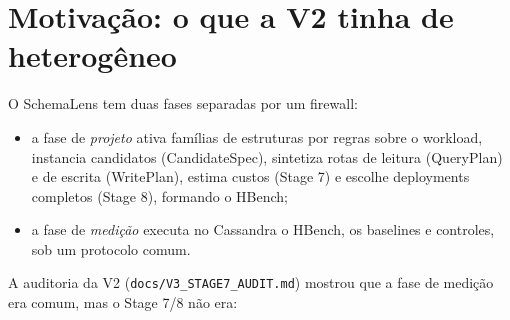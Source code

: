 \documentclass[10pt,a4paper,twoside]{article}
\theoremstyle{definition}\newtheorem{definicao}{Definição}
\begin{document}
\begin{abstract}
\noindent Resultados:
\begin{itemize}
\item O espaço foi reduzido em 67\% a 98\%.
\item Em todos os benchmarks o HBench V3 contém o melhor deployment medido ou um empatado com ele pelo piso de ruído A/A, com regret de 0 a 1,7\%.
\item O rank~1 do TSBS gasta \tsbsRankOneNat$\times$ o tempo do esquema original do TSBS (\tsbsRankOneAli$\times$ na coorte alinhada).
\item No RUBiS 4.1.12, o melhor membro do HBench é 23\% a 29\% mais rápido que NoSE e QPG nas cargas de leitura e mistas, com os mesmos vereditos em 3.11.11 e 100\% de concordância com o oráculo.
\end{itemize}
Há também perdas, discutidas no texto:
\begin{itemize}
\item a ordenação estrutural não prediz latência ($\tau$ entre $-0{,}34$ e $1{,}0$, comparável ao NNLS legado avaliado retrospectivamente);
\item a retenção da fronteira medida de três objetivos cai no TPCx-IoT;
\item a regra de diversidade admitiu um deployment lento no RUBiS.
\end{itemize}
\end{abstract}

\tableofcontents
\bigskip

\section{Motivação: o que a V2 tinha de heterogêneo}
\label{sec:motivacao}

O SchemaLens tem duas fases separadas por um firewall:
\begin{itemize}
\item a fase de \emph{projeto} ativa famílias de estruturas por regras sobre o workload, instancia candidatos (CandidateSpec), sintetiza rotas de leitura (QueryPlan) e de escrita (WritePlan), estima custos (Stage 7) e escolhe deployments completos (Stage 8), formando o HBench;
\item a fase de \emph{medição} executa no Cassandra o HBench, os baselines e controles, sob um protocolo comum.
\end{itemize}
A auditoria da V2 (\texttt{docs/V3\_STAGE7\_AUDIT.md}) mostrou que a fase de medição era comum, mas o Stage 7/8 não era:
\end{document}
